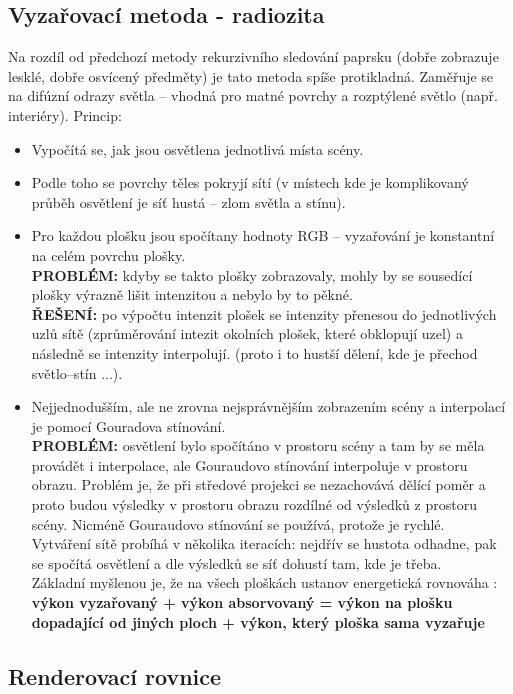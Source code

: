 \subsection{Vyzařovací metoda - radiozita}
Na rozdíl od předchozí metody rekurzivního sledování paprsku (dobře zobrazuje lesklé, dobře osvícený předměty) je tato metoda spíše protikladná. Zaměřuje se na difúzní odrazy světla -- vhodná pro matné povrchy a rozptýlené světlo (např. interiéry). Princip:
\begin{itemize}
\item Vypočítá se, jak jsou osvětlena jednotlivá místa scény.
\item Podle toho se povrchy těles pokryjí sítí (v místech kde je komplikovaný průběh osvětlení je síť hustá -- zlom světla a stínu).
\item Pro každou plošku jsou spočítany hodnoty RGB -- vyzařování je konstantní na celém povrchu plošky.\\
	\textbf{PROBLÉM:} kdyby se takto plošky zobrazovaly, mohly by se sousedící plošky výrazně lišit intenzitou a nebylo by to pěkné.\\
	\textbf{ŘEŠENÍ:} po výpočtu intenzit plošek se intenzity přenesou do jednotlivých uzlů sítě (zprůměrování intezit okolních plošek, které obklopují uzel) a následně se intenzity interpolují. (proto i to hustší dělení, kde je přechod světlo--stín ...).
\item Nejjednodušším, ale ne zrovna nejsprávnějším zobrazením scény a interpolací je pomocí Gouradova stínování. \\
	\textbf{PROBLÉM:} osvětlení bylo spočítáno v prostoru scény a tam by se měla provádět i interpolace, ale Gouraudovo stínování interpoluje v prostoru obrazu. Problém je, že při středové projekci se nezachovává dělící poměr a proto budou výsledky v prostoru obrazu rozdílné od výsledků z prostoru scény. Nicméně Gouraudovo stínování se používá, protože je rychlé.\\
	Vytváření sítě probíhá v několika iteracích: nejdřív se hustota odhadne, pak se spočítá osvětlení a dle výsledků se síť dohustí tam, kde je třeba.\\
	Základní myšlenou je, že na všech ploškách ustanov energetická rovnováha : \\
	\textbf{ výkon vyzařovaný + výkon absorvovaný = výkon na plošku dopadající od jiných ploch + výkon, který ploška sama vyzařuje} 
\end{itemize}




\subsection{Renderovací rovnice}